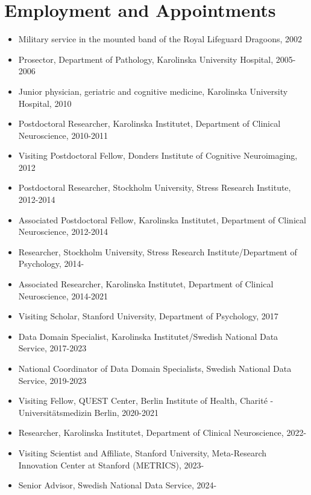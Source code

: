 \documentclass[10pt,a4paper,twocolumn]{article}
\begin{document}
\section{Employment and Appointments}
\begin{itemize}

    \item Military service in the mounted band of the Royal Lifeguard Dragoons, 2002

    \item Prosector, Department of Pathology, Karolinska University Hospital, 2005-2006

    \item Junior physician, geriatric and cognitive medicine, Karolinska University Hospital, 2010

    \item Postdoctoral Researcher, Karolinska Institutet, Department of Clinical Neuroscience, 2010-2011

    \item Visiting Postdoctoral Fellow, Donders Institute of Cognitive Neuroimaging, 2012

    \item Postdoctoral Researcher, Stockholm University, Stress Research Institute, 2012-2014

    \item Associated Postdoctoral Fellow, Karolinska Institutet, Department of Clinical Neuroscience, 2012-2014

    \item Researcher, Stockholm University, Stress Research Institute/Department of Psychology, 2014-

    \item Associated Researcher, Karolinska Institutet, Department of Clinical Neuroscience, 2014-2021

    \item Visiting Scholar, Stanford University, Department of Psychology, 2017

    \item Data Domain Specialist, Karolinska Institutet/Swedish National Data Service, 2017-2023

    \item National Coordinator of Data Domain Specialists, Swedish National Data Service, 2019-2023

    \item Visiting Fellow, QUEST Center, Berlin Institute of Health, Charité - Universitätsmedizin Berlin, 2020-2021

    \item Researcher, Karolinska Institutet, Department of Clinical Neuroscience, 2022-

    \item Visiting Scientist and Affiliate, Stanford University, Meta-Research Innovation Center at Stanford (METRICS), 2023-

    \item Senior Advisor, Swedish National Data Service, 2024-

\end{itemize}
\end{document}
